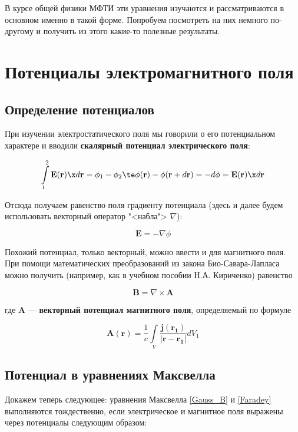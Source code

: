 \documentclass[12pt]{kiarticle}
\begin{document}
В курсе общей физики МФТИ эти уравнения изучаются и рассматриваются в основном именно в такой форме. Попробуем посмотреть на них немного по-другому и получить из этого какие-то полезные результаты. 


\section{Потенциалы электромагнитного поля}

\subsection{Определение потенциалов}

При изучении электростатического поля мы говорили о его потенциальном характере и вводили \textbf{скалярный потенциал электрического поля}:

\[ 
\int\limits_1^2 \mathbf{E(r)} \x d\mathbf{r} = \phi_1 - \phi_2 \te \phi(\mathbf{r}) - \phi(\textbf{r} + d\mathbf{r}) = -d\phi = \mathbf{E(r)} \x d\mathbf{r}
 \]

Отсюда получаем равенство поля градиенту потенциала (здесь и далее будем использовать векторный оператор "<набла"> $ \nabla $):

\begin{equation}\label{phi}
\mathbf{E} = - \nabla \phi 
\end{equation}

Похожий потенциал, только векторный, можно ввести и для магнитного поля. При помощи математических преобразований из закона Био-Савара-Лапласа можно получить (например, как в учебном пособии Н.А. Кириченко) равенство 

\begin{equation}\label{A}
\mathbf{B} = \nabla \times \mathbf{A}
\end{equation}

где $ \mathbf{A} $ --- \textbf{векторный потенциал магнитного поля}, определяемый по формуле

\begin{equation}\label{A_def}
\mathbf{A}(\mathbf{r}) = \dfrac{1}{c} \int\limits_V \dfrac{\mathbf{j}(\mathbf{r_1})}{|\mathbf{r} - \mathbf{r_1}|} dV_1
\end{equation}

\subsection{Потенциал в уравнениях Максвелла}

Докажем теперь следующее: уравнения Максвелла \eqref{Gauss_B} и \eqref{Faradey} выполняются тождественно, если электрическое и магнитное поля выражены через потенциалы следующим образом:
\end{document}

